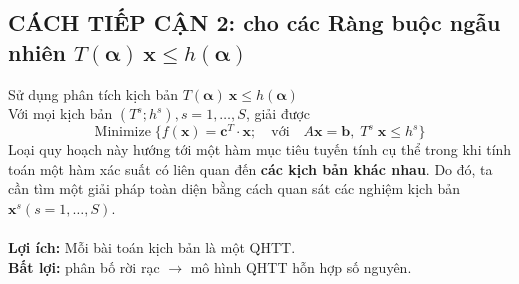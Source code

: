 \documentclass[a4paper]{article}
\begin{document}
	\subsection{CÁCH TIẾP CẬN 2: cho các Ràng buộc ngẫu nhiên $T(\boldsymbol{\alpha}) \: \boldsymbol{x} \leq h(\boldsymbol{\alpha})$}
	Sử dụng phân tích kịch bản $T(\boldsymbol{\alpha}) \: \boldsymbol{x} \leq h(\boldsymbol{\alpha})$\\
    Với mọi kịch bản $(T^s; h^s), s=1,\dots,S$, giải được
    \begin{displaymath}
        \text{Minimize} \; \{ f(\boldsymbol{x}) = \boldsymbol{c}^T \cdot \boldsymbol{x}; \quad
            \text{với} \quad A\boldsymbol{x}=\boldsymbol{b}, \; T^s \; \boldsymbol{x} \leq h^s \}
    \end{displaymath}
    Loại quy hoạch này hướng tới một hàm mục tiêu tuyến tính cụ thể trong khi tính toán 
        một hàm xác suất có liên quan đến \textbf{các kịch bản khác nhau}. Do đó, ta cần tìm một giải pháp
        toàn diện bằng cách quan sát các nghiệm kịch bản $\boldsymbol{x}^s(s=1,\dots,S)$.\\
    \\
    \textbf{Lợi ích:} Mỗi bài toán kịch bản là một QHTT.\\
    \textbf{Bất lợi:} phân bố rời rạc $\longrightarrow$ mô hình QHTT hỗn hợp số nguyên.

\end{document}

